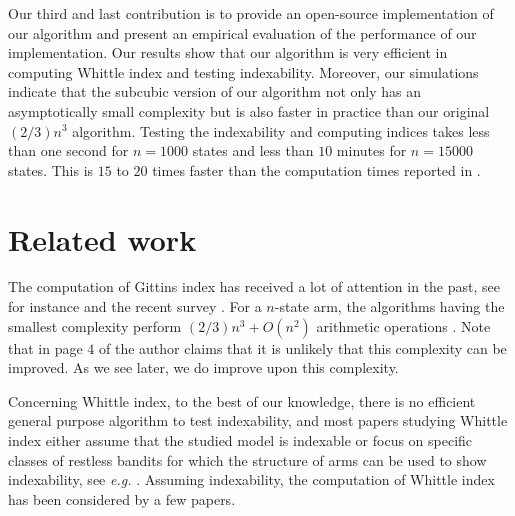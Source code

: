 Our third and last contribution is to provide an open-source implementation of our algorithm and present an empirical evaluation of the performance of our implementation. Our results show that our algorithm is very efficient in computing Whittle index and testing indexability. Moreover, our simulations indicate that the subcubic version of our algorithm not only has an asymptotically small complexity but is also faster in practice than our original $(2/3)n^3$ algorithm. Testing the indexability and computing indices takes less than one second for $n=1000$ states and less than $10$ minutes for $n=15000$ states. This is $15$ to $20$ times faster than the computation times reported in \cite{nino2020fast}.

\section{Related work}
\label{ch:cpt:sec:related}

The computation of Gittins index has received a lot of attention in the past, see for instance \cite{chen1986linear, katehakis1987multi, nino20072, sonin2008generalized} and the recent survey \cite{chakravorty2014multi}.
For a $n$-state arm, the algorithms having the smallest complexity perform $(2/3)n^3+O(n^2)$ arithmetic operations \cite{chakravorty2014multi}.
Note that in page $4$ of \cite{nino2020fast} the author claims that it is unlikely that this complexity can be improved.
As we see later, we do improve upon this complexity. 

Concerning Whittle index, to the best of our knowledge, there is no efficient general purpose algorithm to test indexability, and most papers studying Whittle index either assume that the studied model is indexable or focus on specific classes of restless bandits for which the structure of arms can be used to show indexability, see \emph{e.g.} \cite{aalto2011properties,akbarzadeh2019restless,akbarzadeh2021maintenance,borkar2017whittle}.
Assuming indexability, the computation of Whittle index has been considered by a few papers.

